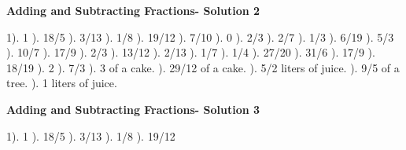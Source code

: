 \documentclass{article}%
\begin{document}
\newpage%
\large%
\begin{center}%
\textbf{Adding and Subtracting Fractions- Solution 2}%
\newline%
\end{center} \normalsize%
1). 1%
). 18/5%
). 3/13%
). 1/8%
). 19/12%
). 7/10%
). 0%
). 2/3%
). 2/7%
). 1/3%
). 6/19%
). 5/3%
). 10/7%
). 17/9%
). 2/3%
). 13/12%
). 2/13%
). 1/7%
). 1/4%
). 27/20%
). 31/6%
). 17/9%
). 18/19%
). 2%
). 7/3%
). 3 of a cake.%
). 29/12 of a cake.%
). 5/2 liters of juice.%
). 9/5 of a tree.%
). 1 liters of juice.%
\newline%
\newpage%
\large%
\begin{center}%
\textbf{Adding and Subtracting Fractions- Solution 3}%
\newline%
\end{center} \normalsize%
1). 1%
). 18/5%
). 3/13%
). 1/8%
). 19/12%
\end{document}
